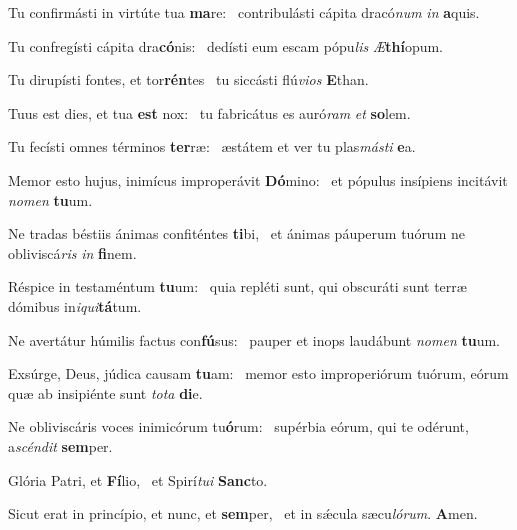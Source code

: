 \item Tu confirmásti in virtúte tua \textbf{ma}re:~\psstar{} contribulásti cápita dracó\textit{num} \textit{in} \textbf{a}quis.

\item Tu confregísti cápita dra\textbf{có}nis:~\psstar{} dedísti eum escam pópu\textit{lis} \textit{Æ}\textbf{thí}opum.

\item Tu dirupísti fontes, et tor\textbf{rén}tes~\psstar{} tu siccásti flú\textit{vios} \textbf{E}than.

\item Tuus est dies, et tua \textbf{est} nox:~\psstar{} tu fabricátus es auró\textit{ram} \textit{et} \textbf{so}lem.

\item Tu fecísti omnes términos \textbf{ter}ræ:~\psstar{} æstátem et ver tu plas\textit{másti} \textbf{e}a.

\item Memor esto hujus, inimícus improperávit \textbf{Dó}mino:~\psstar{} et pópulus insípiens incitávit \textit{nomen} \textbf{tu}um.

\item Ne tradas béstiis ánimas confiténtes \textbf{ti}bi,~\psstar{} et ánimas páuperum tuórum ne obliviscá\textit{ris} \textit{in} \textbf{fi}nem.

\item Réspice in testaméntum \textbf{tu}um:~\psstar{} quia repléti sunt, qui obscuráti sunt terræ dómibus in\textit{iqui}\textbf{tá}tum.

\item Ne avertátur húmilis factus con\textbf{fú}sus:~\psstar{} pauper et inops laudábunt \textit{nomen} \textbf{tu}um.

\item Exsúrge, Deus, júdica causam \textbf{tu}am:~\psstar{} memor esto improperiórum tuórum, eórum quæ ab insipiénte sunt \textit{tota} \textbf{di}e.

\item Ne obliviscáris voces inimicórum tu\textbf{ó}rum:~\psstar{} supérbia eórum, qui te odérunt, a\textit{scéndit} \textbf{sem}per.

\item Glória Patri, et \textbf{Fí}lio,~\psstar{} et Spirí\textit{tui} \textbf{Sanc}to.

\item Sicut erat in princípio, et nunc, et \textbf{sem}per,~\psstar{} et in sǽcula sæcu\textit{lórum}. \textbf{A}men.